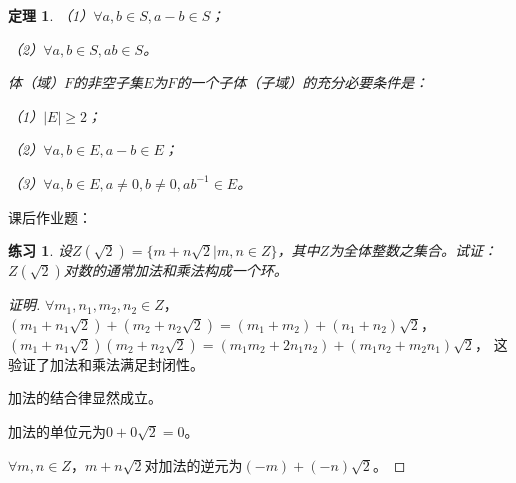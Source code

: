 \documentclass{article}
\newtheorem{Thm}{定理}
\newtheorem{Exercise}{练习}
\begin{document}
\begin{CJK*}{UTF8}{gbsn}
\begin{Thm}
    （1）$\forall a,b\in S, a-b\in S$；
  
    （2）$\forall a,b\in S, ab\in S$。
  
    体（域）$F$的非空子集$E$为$F$的一个子体（子域）的充分必要条件是：
  
    （1）$|E|\geq 2$；
  
    （2）$\forall a,b \in E, a-b\in E$；
  
    （3）$\forall a,b \in E, a\neq 0, b\neq 0, ab^{-1}\in E$。
  \end{Thm}  



课后作业题：
\begin{Exercise}
  设$Z(\sqrt{2})=\{m+n\sqrt{2}|m,n\in Z\}$，其中$Z$为全体整数之集合。试证：$Z(\sqrt{2})$对数的通常加法和乘法构成一个环。
\end{Exercise}
\begin{proof}[证明]
  $\forall m_1,n_1,m_2,n_2\in Z$，$(m_1+n_1\sqrt{2})+(m_2+n_2\sqrt{2})=(m_1+m_2)+(n_1+n_2)\sqrt{2}$，$(m_1+n_1\sqrt{2})(m_2+n_2\sqrt{2})=(m_1m_2+2n_1n_2)+(m_1n_2+m_2n_1)\sqrt{2}$，
  这验证了加法和乘法满足封闭性。

  加法的结合律显然成立。

  加法的单位元为$0+0\sqrt{2}=0$。

  $\forall m,n\in Z$，$m+n\sqrt{2}$对加法的逆元为$(-m)+(-n)\sqrt{2}$。


\end{proof}
\end{CJK*}
\end{document}
